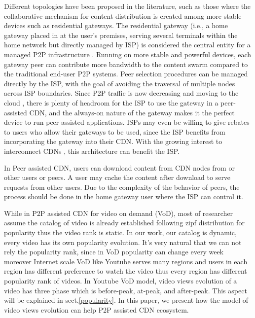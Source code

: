 \documentclass[conference]{IEEEtran}
\begin{document}
Different topologies have been proposed in the literature, such as those where the collaborative mechanism for content distribution is
created among more stable devices such as residential gateways.  
The residential gateway (i.e., a home gateway placed in at the user's premises, serving several terminals within the home network but directly managed by ISP) is considered the central entity for a managed P2P infrastructure \cite{Misra:2010:IPS:1811099.1811064,Cha:2008:NTP:1855641.1855646}.
Running on more stable and powerful devices, each gateway peer can contribute more bandwidth to the content swarm compared to the traditional end-user P2P systems.  Peer selection procedures can be managed directly by the ISP, with the goal of avoiding the traversal of multiple nodes across ISP boundaries.  
Since P2P traffic is now decreasing and moving to the cloud \cite{Labovitz:2010:IIT:2043164.1851194}, there is plenty of headroom for the ISP to use the gateway in a peer-assisted CDN, and the always-on nature of the gateway makes it the perfect device to run peer-assisted applications.  
ISPs may even be willing to give rebates to users who allow their gateways to be used, since the ISP benefits from incorporating the gateway into their CDN.  With the growing interest to interconnect CDNs \cite{cdni,oceanproject}, this architecture can benefit the ISP.

In Peer assisted CDN, users can download content from CDN nodes from or other users or peers. 
A user may cache the content after download to serve requests from other users. 
Due to the complexity of the behavior of peers, the process should be done in the home gateway user where the ISP can control it.

While in P2P assisted CDN for video on demand (VoD), most of researcher assume the catalog of video is already established following zipf distribution for popularity thus the video rank is static. 
In our work, our catalog is dynamic, every video has its own popularity evolution.
It's very natural that we can not rely the popularity rank, since in VoD popularity can change every week moreover Internet scale VoD like Youtube serves many regions and users in each region has different preference to watch the video thus every region has different popularity rank of videos. 
In Youtube VoD model, video views evolution of a video has three phase which is before-peak, at-peak, and after-peak. 
This aspect will be explained in sect.\ref{popularity}.
In this paper, we present how the model of video views evolution can help P2P assisted CDN ecosystem.  
\end{document}
